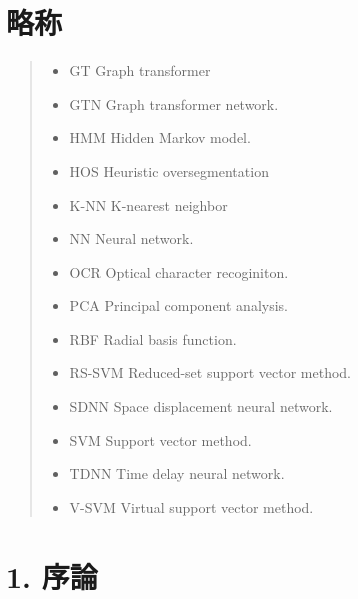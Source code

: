 \documentclass[twocolumn]{jarticle}     %
\begin{document}
\section*{略称}
\begin{quote}
  \begin{itemize}
   \item GT Graph transformer
   \item GTN Graph transformer network.
   \item HMM Hidden Markov model.
   \item HOS Heuristic oversegmentation
   \item K-NN K-nearest neighbor
   \item NN Neural network.
   \item OCR Optical character recoginiton.
   \item PCA Principal component analysis.
   \item RBF Radial basis function.
   \item RS-SVM Reduced-set support vector method.
   \item SDNN Space displacement neural network.
   \item SVM Support vector method.
   \item TDNN Time delay neural network.
   \item V-SVM Virtual support vector method.
  \end{itemize}
 \end{quote}

 \section{1. 序論}
\end{document}
